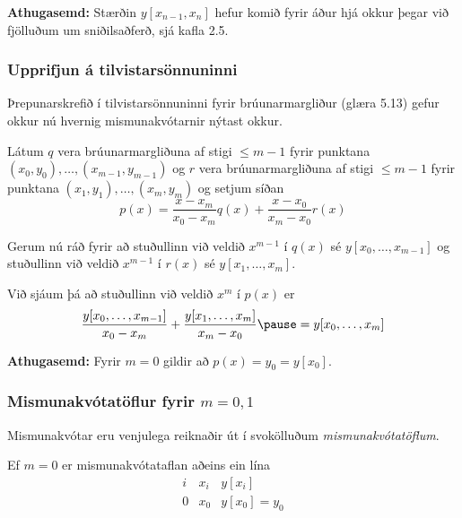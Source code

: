 \documentclass[icelandic,a4paper,12pt]{article}
\begin{document}
  \textbf{Athugasemd:} 
  Stærðin $y[x_{n-1},x_n]$ hefur komið fyrir áður hjá okkur þegar við fjölluðum
  um sniðilsaðferð, sjá kafla 2.5.





\subsubsection{Upprifjun á tilvistarsönnuninni} 

Þrepunarskrefið í tilvistarsönnuninni fyrir brúunarmargliður (glæra 5.13)
gefur okkur nú hvernig mismunakvótarnir nýtast okkur.

\pause
\smallskip
Látum $q$ vera brúunarmargliðuna 
af stigi $\leq m-1$ fyrir punktana $(x_0,y_0), \ldots,
(x_{m-1},y_{m-1})$  og $r$ vera  brúunarmargliðuna af stigi $\leq m-1$
fyrir punktana $(x_1,y_1), \ldots, (x_m,y_m)$ og setjum síðan
\begin{equation*}
  p(x) = \frac{x-x_m}{x_0-x_m}q(x) + \frac{x-x_0}{x_m-x_0}r(x)
\end{equation*}

Gerum nú ráð fyrir að stuðullinn við veldið $x^{m-1}$ í $q(x)$ sé $y[x_0, \ldots, x_{m-1}]$
og stuðullinn við veldið $x^{m-1}$ í $r(x)$ sé $y[x_1, \ldots, x_m]$.

\pause
\smallskip
Við sjáum þá að stuðullinn við veldið
$x^m$ í $p(x)$ er
\begin{equation*}
  \frac{y[x_0, \ldots, x_{m-1}]}{x_0-x_m} + 
  \frac{y[x_1, \ldots, x_m]}{x_m - x_0}
  \pause
  = y[x_0, \ldots, x_m] 
\end{equation*}

\pause
\smallskip
 \textbf{Athugasemd:} Fyrir $m=0$ gildir að $p(x) = y_0 = y[x_0]$.



\subsubsection{Mismunakvótatöflur fyrir $m=0,1$} 
Mismunakvótar eru venjulega reiknaðir út í svokölluðum
{\it mismunakvótatöflum}.

Ef $m = 0$ er mismunakvótataflan aðeins ein lína
\begin{equation*}
  \begin{array}{c|c|c}
    i & x_i & y[x_i] \\
    \hline
    0 & x_0 & y[x_0] = y_0
  \end{array}
\end{equation*}
\end{document}
